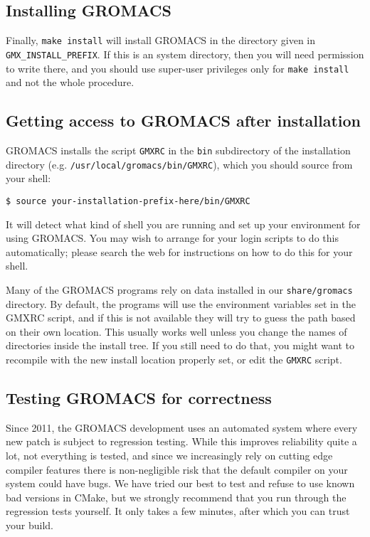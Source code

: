 \documentclass{article}[12pt,a4paper,twoside]
\newcommand{\gromacs}{GROMACS}
\newcommand{\cmake}{CMake}
\begin{document}
\subsection{Installing \gromacs{}}

Finally, \verb+make install+ will install \gromacs{} in the
directory given in \verb+GMX_INSTALL_PREFIX+. If this is an system
directory, then you will need permission to write there, and you
should use super-user privileges only for \verb+make install+ and
not the whole procedure.

\subsection{Getting access to \gromacs{} after installation}

\gromacs{} installs the script \verb+GMXRC+ in the \verb+bin+
subdirectory of the installation directory
(e.g. \verb+/usr/local/gromacs/bin/GMXRC+), which you should source
from your shell:
\begin{verbatim}
$ source your-installation-prefix-here/bin/GMXRC
\end{verbatim}

It will detect what kind of shell you are running and set up your
environment for using \gromacs{}. You may wish to arrange for your
login scripts to do this automatically; please search the web for
instructions on how to do this for your shell. 

Many of the \gromacs{} programs rely on data installed in our
\verb+share/gromacs+ directory. By default, the programs will use
the environment variables set in the GMXRC script, and if this is not
available they will try to guess the path based on their own location.
This usually works well unless you change the names of directories
inside the install tree. If you still need to do that, you might want to recompile
with the new install location properly set, or edit the \verb+GMXRC+ script.

\subsection{Testing \gromacs{} for correctness}
Since 2011, the \gromacs{} development uses an automated system where
every new patch is subject to regression testing. While this improves
reliability quite a lot, not everything is tested, and since we
increasingly rely on cutting edge compiler features there is
non-negligible risk that the default compiler on your system could
have bugs. We have tried our best to test and refuse to use known bad
versions in \cmake{}, but we strongly recommend that you run through
the regression tests yourself. It only takes a few minutes, after
which you can trust your build.
\end{document}
